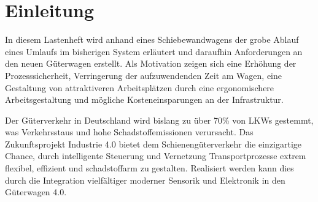 \section{Einleitung}
In diesem Lastenheft wird anhand eines Schiebewandwagens der grobe Ablauf eines Umlaufs im bisherigen System erläutert und daraufhin Anforderungen an den neuen Güterwagen erstellt. Als Motivation zeigen sich %
eine Erhöhung der Prozesssicherheit, Verringerung der aufzuwendenden Zeit am Wagen, eine Gestaltung von attraktiveren Arbeitsplätzen durch eine ergonomischere Arbeitsgestaltung und mögliche Kosteneinsparungen an der Infrastruktur.\par
Der Güterverkehr in Deutschland wird bislang zu über 70\% von LKWs gestemmt, was Verkehrsstaus und hohe Schadstoffemissionen verursacht. Das Zukunftsprojekt Industrie 4.0 bietet dem Schienengüterverkehr die einzigartige Chance, durch intelligente Steuerung und Vernetzung Transportprozesse extrem flexibel, effizient und schadstoffarm zu gestalten. Realisiert werden kann dies durch die Integration vielfältiger moderner Sensorik und Elektronik in den Güterwagen 4.0.\cite{AZAP}\par

